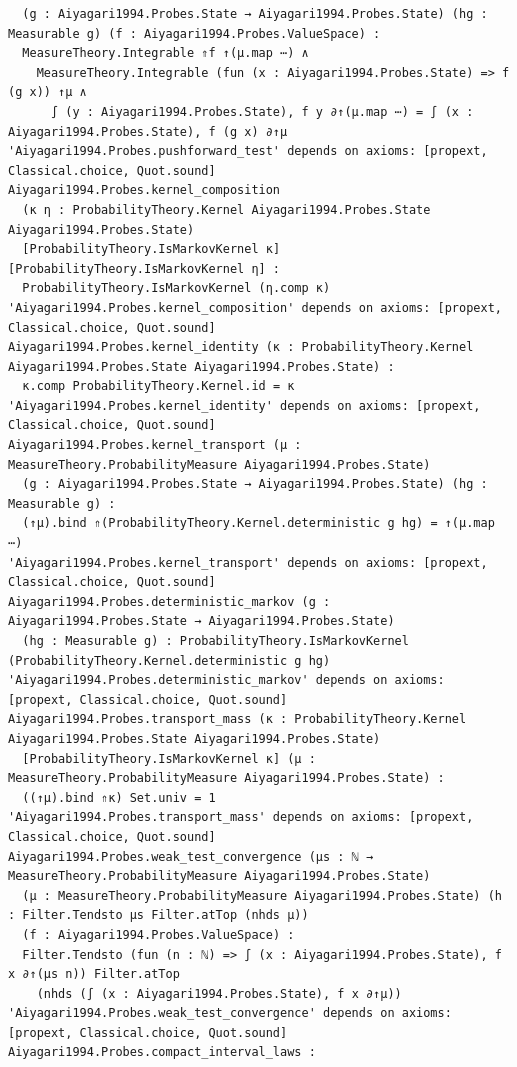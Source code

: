 \documentclass[
  11pt,
]{article}
\begin{document}
\begin{verbatim}
  (g : Aiyagari1994.Probes.State → Aiyagari1994.Probes.State) (hg : Measurable g) (f : Aiyagari1994.Probes.ValueSpace) :
  MeasureTheory.Integrable ⇑f ↑(μ.map ⋯) ∧
    MeasureTheory.Integrable (fun (x : Aiyagari1994.Probes.State) => f (g x)) ↑μ ∧
      ∫ (y : Aiyagari1994.Probes.State), f y ∂↑(μ.map ⋯) = ∫ (x : Aiyagari1994.Probes.State), f (g x) ∂↑μ
'Aiyagari1994.Probes.pushforward_test' depends on axioms: [propext, Classical.choice, Quot.sound]
Aiyagari1994.Probes.kernel_composition
  (κ η : ProbabilityTheory.Kernel Aiyagari1994.Probes.State Aiyagari1994.Probes.State)
  [ProbabilityTheory.IsMarkovKernel κ] [ProbabilityTheory.IsMarkovKernel η] :
  ProbabilityTheory.IsMarkovKernel (η.comp κ)
'Aiyagari1994.Probes.kernel_composition' depends on axioms: [propext, Classical.choice, Quot.sound]
Aiyagari1994.Probes.kernel_identity (κ : ProbabilityTheory.Kernel Aiyagari1994.Probes.State Aiyagari1994.Probes.State) :
  κ.comp ProbabilityTheory.Kernel.id = κ
'Aiyagari1994.Probes.kernel_identity' depends on axioms: [propext, Classical.choice, Quot.sound]
Aiyagari1994.Probes.kernel_transport (μ : MeasureTheory.ProbabilityMeasure Aiyagari1994.Probes.State)
  (g : Aiyagari1994.Probes.State → Aiyagari1994.Probes.State) (hg : Measurable g) :
  (↑μ).bind ⇑(ProbabilityTheory.Kernel.deterministic g hg) = ↑(μ.map ⋯)
'Aiyagari1994.Probes.kernel_transport' depends on axioms: [propext, Classical.choice, Quot.sound]
Aiyagari1994.Probes.deterministic_markov (g : Aiyagari1994.Probes.State → Aiyagari1994.Probes.State)
  (hg : Measurable g) : ProbabilityTheory.IsMarkovKernel (ProbabilityTheory.Kernel.deterministic g hg)
'Aiyagari1994.Probes.deterministic_markov' depends on axioms: [propext, Classical.choice, Quot.sound]
Aiyagari1994.Probes.transport_mass (κ : ProbabilityTheory.Kernel Aiyagari1994.Probes.State Aiyagari1994.Probes.State)
  [ProbabilityTheory.IsMarkovKernel κ] (μ : MeasureTheory.ProbabilityMeasure Aiyagari1994.Probes.State) :
  ((↑μ).bind ⇑κ) Set.univ = 1
'Aiyagari1994.Probes.transport_mass' depends on axioms: [propext, Classical.choice, Quot.sound]
Aiyagari1994.Probes.weak_test_convergence (μs : ℕ → MeasureTheory.ProbabilityMeasure Aiyagari1994.Probes.State)
  (μ : MeasureTheory.ProbabilityMeasure Aiyagari1994.Probes.State) (h : Filter.Tendsto μs Filter.atTop (nhds μ))
  (f : Aiyagari1994.Probes.ValueSpace) :
  Filter.Tendsto (fun (n : ℕ) => ∫ (x : Aiyagari1994.Probes.State), f x ∂↑(μs n)) Filter.atTop
    (nhds (∫ (x : Aiyagari1994.Probes.State), f x ∂↑μ))
'Aiyagari1994.Probes.weak_test_convergence' depends on axioms: [propext, Classical.choice, Quot.sound]
Aiyagari1994.Probes.compact_interval_laws :

\end{verbatim}
\end{document}
